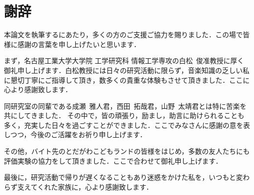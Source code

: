 \chapter*{謝辞}
本論文を執筆するにあたり，多くの方のご支援ご協力を賜りました．この場で皆様に感謝の言葉を申し上げたいと思います．

まず，名古屋工業大学大学院 工学研究科 情報工学専攻の白松~俊准教授に厚く御礼申し上げます．白松教授には日々の研究活動に限らず，音楽知識の乏しい私に懇切丁寧にご指導して頂き，数多くの貴重な体験もさせて頂きました．ここに心より感謝致します．


同研究室の同輩である成瀬~雅人君，西田~拓哉君，山野~太靖君とは特に苦楽を共にしてきました．
その中で，皆の頑張り，励まし，助言に助けられることも多く，充実した日々を過ごすことができました．ここでみなさんに感謝の意を表しつつ，今後のご活躍をお祈り申し上げます．

その他，バイト先のとだがわこどもランドの皆様をはじめ，多数の友人たちにも評価実験の協力をして頂きました．ここで合わせて御礼申し上げます．

最後に，研究活動で帰りが遅くなることもあり迷惑をかけた私を，いつもと変わらず支えてくれた家族に，心より感謝致します．

\vspace*{4.5mm}

\begin{flushright}
\vspace*{1.8mm}
\end{flushright}
